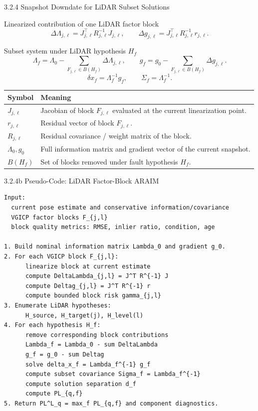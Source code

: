 \documentclass[10pt,aspectratio=169,xcolor=dvipsnames]{beamer}
\begin{document}
\begin{frame}{3.2.4 Snapshot Downdate for LiDAR Subset Solutions}
  \small
  \begin{block}{Linearized contribution of one LiDAR factor block}
    \[
      \Delta\Lambda_{j,\ell}=J_{j,\ell}^{\top}R_{j,\ell}^{-1}J_{j,\ell},\qquad
      \Delta g_{j,\ell}=J_{j,\ell}^{\top}R_{j,\ell}^{-1}r_{j,\ell}.
    \]
  \end{block}

  \begin{block}{Subset system under LiDAR hypothesis $H_f$}
    \[
      \Lambda_f=\Lambda_0-\sum_{F_{j,\ell}\in B(H_f)}\Delta\Lambda_{j,\ell},\qquad
      g_f=g_0-\sum_{F_{j,\ell}\in B(H_f)}\Delta g_{j,\ell}.
    \]
    \[
      \delta x_f=\Lambda_f^{-1}g_f,\qquad \Sigma_f=\Lambda_f^{-1}.
    \]
  \end{block}

  \begin{table}\scriptsize
    \begin{tabular}{p{} p{}}
      \toprule
      \textbf{Symbol} & \textbf{Meaning}\\
      \midrule
      $J_{j,\ell}$ & Jacobian of block $F_{j,\ell}$ evaluated at the current linearization point.\\
      $r_{j,\ell}$ & Residual vector of block $F_{j,\ell}$.\\
      $R_{j,\ell}$ & Residual covariance / weight matrix of the block.\\
      $\Lambda_0,g_0$ & Full information matrix and gradient vector of the current snapshot.\\
      $B(H_f)$ & Set of blocks removed under fault hypothesis $H_f$.\\
      \bottomrule
    \end{tabular}
  \end{table}
\end{frame}

\begin{frame}[fragile]{3.2.4b Pseudo-Code: LiDAR Factor-Block ARAIM}
\begin{lstlisting}
Input:
  current pose estimate and conservative information/covariance
  VGICP factor blocks F_{j,l}
  block quality metrics: RMSE, inlier ratio, condition, age

1. Build nominal information matrix Lambda_0 and gradient g_0.
2. For each VGICP block F_{j,l}:
      linearize block at current estimate
      compute DeltaLambda_{j,l} = J^T R^{-1} J
      compute Deltag_{j,l} = J^T R^{-1} r
      compute bounded block risk gamma_{j,l}
3. Enumerate LiDAR hypotheses:
      H_source, H_target(j), H_level(l)
4. For each hypothesis H_f:
      remove corresponding block contributions
      Lambda_f = Lambda_0 - sum DeltaLambda
      g_f = g_0 - sum Deltag
      solve delta_x_f = Lambda_f^{-1} g_f
      compute subset covariance Sigma_f = Lambda_f^{-1}
      compute solution separation d_f
      compute PL_{q,f}
5. Return PL^L_q = max_f PL_{q,f} and component diagnostics.
\end{lstlisting}
\end{frame}
\end{document}
